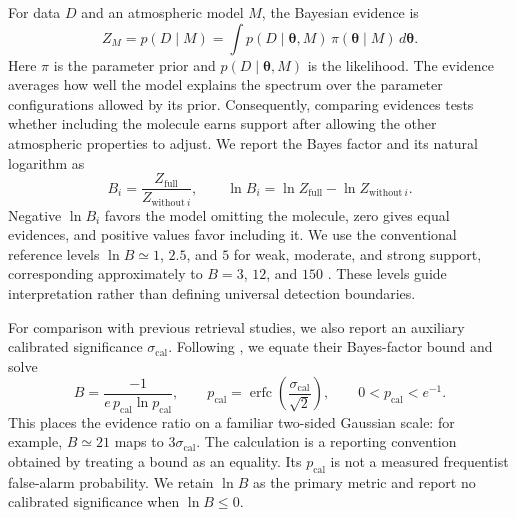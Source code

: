 For data $D$ and an atmospheric model $M$, the Bayesian evidence is
\begin{equation}
Z_M=p(D\mid M)=\int p(D\mid\boldsymbol{\theta},M)\,
\pi(\boldsymbol{\theta}\mid M)\,d\boldsymbol{\theta}.
\label{eq:life_evidence}
\end{equation}
Here $\pi$ is the parameter prior and $p(D\mid\boldsymbol{\theta},M)$ is the likelihood. The evidence averages how well the model explains the spectrum over the parameter configurations allowed by its prior. Consequently, comparing evidences tests whether including the molecule earns support after allowing the other atmospheric properties to adjust. We report the Bayes factor and its natural logarithm as
\begin{equation}
B_i=\frac{Z_{\mathrm{full}}}{Z_{\mathrm{without}\ i}},
\qquad
\ln B_i=\ln Z_{\mathrm{full}}-\ln Z_{\mathrm{without}\ i}.
\label{eq:life_molecular_bayes}
\end{equation}
Negative $\ln B_i$ favors the model omitting the molecule, zero gives equal evidences, and positive values favor including it. We use the conventional reference levels $\ln B\simeq1$, $2.5$, and $5$ for weak, moderate, and strong support, corresponding approximately to $B=3$, $12$, and $150$ \citep{bennekeSeager2013Cloudy}. These levels guide interpretation rather than defining universal detection boundaries.

For comparison with previous retrieval studies, we also report an auxiliary calibrated significance $\sigma_{\mathrm{cal}}$. Following \citet{bennekeSeager2013Cloudy}, we equate their Bayes-factor bound and solve
\begin{equation}
B=\frac{-1}{e\,p_{\mathrm{cal}}\ln p_{\mathrm{cal}}},
\qquad
p_{\mathrm{cal}}=\operatorname{erfc}\!\left(\frac{\sigma_{\mathrm{cal}}}{\sqrt{2}}\right),
\qquad 0<p_{\mathrm{cal}}<e^{-1}.
\label{eq:life_sigma_cal}
\end{equation}
This places the evidence ratio on a familiar two-sided Gaussian scale: for example, $B\simeq21$ maps to $3\sigma_{\mathrm{cal}}$. The calculation is a reporting convention obtained by treating a bound as an equality. Its $p_{\mathrm{cal}}$ is not a measured frequentist false-alarm probability. We retain $\ln B$ as the primary metric and report no calibrated significance when $\ln B\leq0$.

